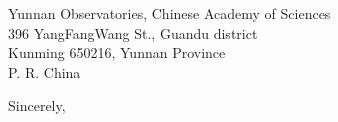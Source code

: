 \documentclass[12pt]{YNAOletter}
\begin{document}
%
%
%
\begin{letter}{
    Yunnan Observatories, Chinese Academy of Sciences\\ 
    396 YangFangWang St., Guandu district\\ 
    Kunming 650216, Yunnan Province\\
    P. R. China 
    }
    
%



\closing{Sincerely,}




\end{letter}
\end{document}
